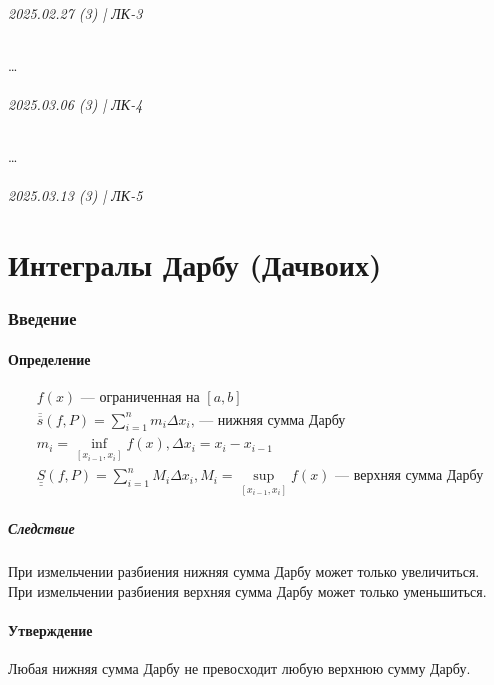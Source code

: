 \documentclass{article}
\begin{document}
\newpage
\paragraph{2025.02.27 (3) | ЛК-3}
\dots




\newpage
\paragraph{2025.03.06 (3) | ЛК-4}
\dots




\newpage
\paragraph{2025.03.13 (3) | ЛК-5}
\part{Интегралы Дарбу (Дачвоих)}

\section{Введение}
\subsection{Определение}
\begin{gather*}
    f(x) \text{ --- ограниченная на } [a, b] \\
    \overline{\overline{s}} \left(f, P\right) = \sum_{i=1}^{n} m_i \Delta x_i \text{, --- нижняя сумма Дарбу} \\
    m_i = \inf_{[x_{i-1}, x_i]} f(x), \Delta x_i = x_i - x_{i-1} \\
    \underline{\underline{S}} \left(f, P\right) = \sum_{i=1}^{n} M_i \Delta x_i, 
    M_i = \sup_{[x_{i-1}, x_i]} f(x) \text{ --- верхняя сумма Дарбу}
\end{gather*}

\subsubsection{Следствие}
При измельчении разбиения нижняя сумма Дарбу может только увеличиться. \\
При измельчении разбиения верхняя сумма Дарбу может только уменьшиться.



\subsection{Утверждение}
Любая нижняя сумма Дарбу не превосходит любую верхнюю сумму Дарбу.
\end{document}
